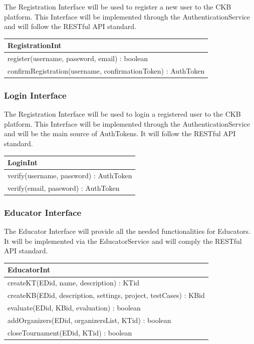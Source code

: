 \documentclass[11pt]{report}
\begin{document}
The Registration Interface will be used to register a new user to the CKB platform.
This Interface will be implemented through the AuthenticationService and will follow the RESTful API standard.

\begin{longtable}[h] {|p{130mm}|}
\hline
\textbf{RegistrationInt} \\ \hline
register(username, password, email) : boolean \\
confirmRegistration(username, confirmationToken) : AuthToken \\
\hline
\end{longtable}

\subsubsection{Login Interface}
The Registration Interface will be used to login a registered user to the CKB platform.
This Interface will be implemented through the AuthenticationService and will be the main
source of AuthTokens.
It will follow the RESTful API standard.

\begin{longtable}[h] {|p{130mm}|}
\hline
\textbf{LoginInt} \\ \hline
verify(username, password) : AuthToken \\
verify(email, password) : AuthToken \\
\hline
\end{longtable}

\subsubsection{Educator Interface}
The Educator Interface will provide all the needed functionalities for Educators.
It will be implemented via the EducatorService and will comply the RESTful API standard.

\begin{longtable}[h] {|p{130mm}|}
\hline
\textbf{EducatorInt} \\ \hline
createKT(EDid, name, description) : KTid \\
createKB(EDid, description, settings, project, testCases) : KBid \\
evaluate(EDid, KBid, evaluation) : boolean \\
addOrganizers(EDid, organizersList, KTid) : boolean \\
closeTournament(EDid, KTid) : boolean \\
\hline
\end{longtable}
\end{document}
